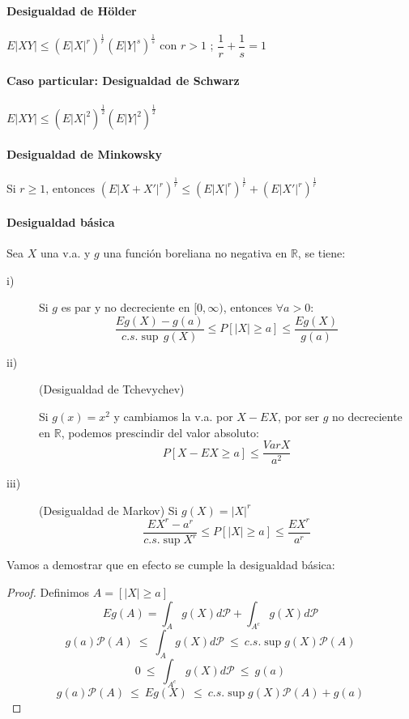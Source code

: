 \paragraph{Desigualdad de Hölder}
$E|XY| \leq \left(E|X|^r \right)^{\frac{1}{r}}  \left(E|Y|^s \right)^{\frac{1}{s}}$ con $r>1$ ; $ \dfrac{1}{r}+\dfrac{1}{s}=1$

\paragraph{Caso particular: Desigualdad de Schwarz}
$E|XY|\leq \left(E|X|^2 \right)^{\frac{1}{2}} \left(E|Y|^2 \right)^{\frac{1}{2}}$

\paragraph{Desigualdad de Minkowsky}
Si $r \geq 1 \text{, entonces } (E|X+X'|^r)^{\frac{1}{r}} \leq \left(E|X|^r \right)^{\frac{1}{r}} + \left(E|X'|^r \right)^{\frac{1}{r}}$

\paragraph{Desigualdad básica}
Sea $X$ una v.a. y $g$ una función boreliana no negativa en $\mathbb{R}$, se tiene:

\begin{description}
\item[i)] Si $g$ es par y no decreciente en $[0,\infty)$, entonces $\forall a>0$:
$$\dfrac{Eg(X)-g(a)}{c.s. \sup\, g(X)}\leq P[|X|\geq a]\leq \dfrac{E g(X)}{g(a)}$$
\item[ii)] (Desigualdad de Tchevychev) 

Si $g(x)=x^2$ y cambiamos la v.a. por $X-EX$, por ser $g$ no decreciente en $\mathbb{R}$, podemos prescindir del valor absoluto:
$$ P[X-EX \geq a] \leq \frac{Var X}{a^2}$$
\item[iii)] (Desigualdad de Markov) Si $g(X) = |X|^r$
$$ \frac{EX^r - a^r}{c.s.\sup X^r} \leq P[|X| \geq a] \leq \frac{EX^r}{a^r} $$
\end{description}

Vamos a demostrar que en efecto se cumple la desigualdad básica:
\begin{proof}
Definimos $A = [|X| \geq a]$
$$ Eg(A) = \int_A g(X) d\mathcal{P} + \int_{A^c} g(X) d\mathcal{P} $$
$$ g(a)\mathcal{P}(A)\ \leq\ \int_A g(X)d\mathcal{P} \ \leq \ c.s.\sup g(X)\mathcal{P}(A) $$
$$ 0 \ \leq \ \int_{A^c} g(X) d\mathcal{P} \ \leq \ g(a) $$
$$ g(a)\mathcal{P}(A) \ \leq\ Eg(X) \ \leq \ c.s.\sup g(X)\mathcal{P}(A) + g(a) $$

\end{proof}

